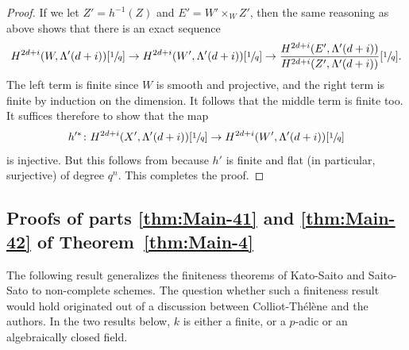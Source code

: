 \documentclass[11pt]{article}
\numberwithin{equation}{section}
\let\ra\rightarrow
\theoremstyle{definition}
\newcommand{\thmref}{Theorem~\ref}
\begin{document}
\begin{proof}
If we let $Z' = h^{-1}(Z)$ and $E' = W' \times_W Z'$, then the same reasoning
as above shows that there is an exact sequence
\begin{align*}
H^{2d+i}(W, \Lambda'(d+i))[\sfrac{1}{q}] \ra
H^{2d+i}(W', \Lambda'(d+i))[\sfrac{1}{q}] \ra
\frac{H^{2d+i}(E', \Lambda'(d+i))}{H^{2d+i}(Z', \Lambda'(d+i))}[\sfrac{1}{q}].
\end{align*}
The left term is finite since $W$ is smooth and projective, and the right term
is finite by induction on the dimension. It follows that the middle term is
finite too. It suffices therefore to show that the map
\[
h^{\prime \ast} \colon H^{2d+i}(X',\Lambda'(d+i))[\sfrac{1}{q}] \to
H^{2d+i}(W',\Lambda'(d+i))[\sfrac{1}{q}]
\]
is injective. But this follows from \cite[Prop.\,6.3]{Cisinski-Deglise}
because $h'$ is finite and flat (in particular, surjective) of degree $q^n$.
This completes the proof.
\end{proof}

\subsection{Proofs of parts \eqref{thm:Main-41} and \eqref{thm:Main-42} of \thmref{thm:Main-4}}
\label{sec:M4-pf-1}
The following result generalizes the finiteness theorems of
Kato-Saito \cite{Kato-Saito-1} and Saito-Sato
\cite{SaitoSatoAnnals} to non-complete schemes.
The question whether such a finiteness result would hold originated out of
a discussion between Colliot-Thélène and the authors.
In the two results below, $k$ is either a finite, or a $p$-adic or an algebraically
closed field.
\end{document}
